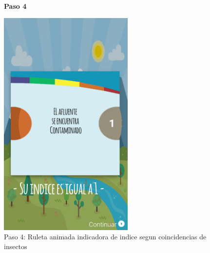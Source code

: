 				\begin{figure}[H]
					\centering
					\textbf{Paso 4}\par\medskip
						\includegraphics[width=0.6\textwidth]{Screenshots/ruedita.png}
						\caption{Paso 4: Ruleta animada indicadora de indice segun coincidencias de insectos}
				\end{figure}

